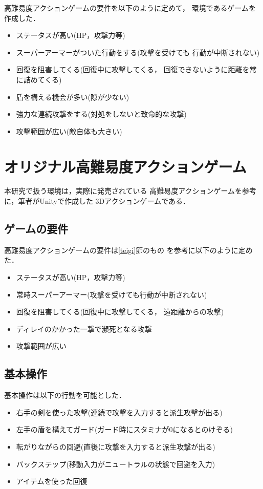 \documentclass[a4paper,12pt,oneside,openany,titlepage]{jreport}
\begin{document}
 高難易度アクションゲームの要件を以下のように定めて，
 環境であるゲームを作成した．
 {
\begin{itemize}[itemsep=1pt, leftmargin=27pt, labelsep=5pt, parsep=0pt]
  \item ステータスが高い(HP，攻撃力等)
  \item スーパーアーマーがついた行動をする(攻撃を受けても
  行動が中断されない)
  \item 回復を阻害してくる(回復中に攻撃してくる，
  回復できないように距離を常に詰めてくる)
  \item 盾を構える機会が多い(隙が少ない)
  \item 強力な連続攻撃をする(対処をしないと致命的な攻撃)
  \item 攻撃範囲が広い(敵自体も大きい)
\end{itemize}
}
\newpage



\chapter{オリジナル高難易度アクションゲーム}
 \thispagestyle{fancy}
 \lhead{\leftmark}
 \rhead{\thepage}
 \renewcommand{\headrulewidth}{1pt}


 本研究で扱う環境は，実際に発売されている
 高難易度アクションゲームを参考に，筆者がUnityで作成した
 3Dアクションゲームである．
 
 \section{ゲームの要件}
 高難易度アクションゲームの要件は\ref{teigi}節のもの
 を参考に以下のように定めた．
 {
 \begin{itemize}[itemsep=1pt, leftmargin=27pt, labelsep=5pt, parsep=0pt]
   \item ステータスが高い(HP，攻撃力等)
   \item 常時スーパーアーマー(攻撃を受けても行動が中断されない)
   \item 回復を阻害してくる(回復中に攻撃してくる，
   遠距離からの攻撃)
   \item ディレイのかかった一撃で瀕死となる攻撃
   \item 攻撃範囲が広い
 \end{itemize}
 }
 
 \section{基本操作}
 基本操作は以下の行動を可能とした．
 {
 \begin{itemize}[itemsep=1pt, leftmargin=27pt, labelsep=5pt, parsep=0pt]
   \item 右手の剣を使った攻撃(連続で攻撃を入力すると派生攻撃が出る)
   \item 左手の盾を構えてガード(ガード時にスタミナが0になるとのけぞる)
   \item 転がりながらの回避(直後に攻撃を入力すると派生攻撃が出る)
   \item バックステップ(移動入力がニュートラルの状態で回避を入力)
   \item アイテムを使った回復
 \end{itemize}
 }
 
\end{document}
